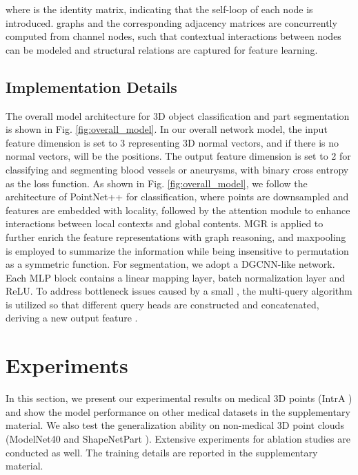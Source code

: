 \documentclass[10pt,twocolumn,letterpaper]{article}
\begin{document}
where  is the identity matrix, indicating that the self-loop of each node is introduced.  graphs and the corresponding adjacency matrices  are concurrently computed from  channel nodes, such that contextual interactions between nodes can be modeled and structural relations are captured for feature learning.


\subsection{Implementation Details}
The overall model architecture for 3D object classification and part segmentation is shown in Fig. \ref{fig:overall_model}.
In our overall network model, the input feature dimension  is set to 3 representing 3D normal vectors, and if there is no normal vectors,  will be the  positions.
The output feature dimension  is set to 2 for classifying and segmenting blood vessels or aneurysms, with binary cross entropy as the loss function.
As shown in Fig. \ref{fig:overall_model}, we follow the architecture of PointNet++ for classification, where points are downsampled and features are embedded with locality, followed by the attention module to enhance interactions between local contexts and global contents.
MGR is applied to further enrich the feature representations with graph reasoning, and maxpooling is employed to summarize the information while being insensitive to permutation as a symmetric function.
For segmentation, we adopt a DGCNN-like network.
Each MLP block contains a linear mapping layer, batch normalization layer and ReLU.
To address bottleneck issues caused by a small , the multi-query algorithm \cite{lambdanetworks} is utilized so that  different query heads are constructed and concatenated, deriving a new output feature .






\section{Experiments}
In this section, we present our experimental results on medical 3D points (IntrA \cite{yang2020intra}) and show the model performance on other medical datasets in the supplementary material.
We also test the generalization ability on non-medical 3D point clouds (ModelNet40 \cite{wu20153d} and ShapeNetPart \cite{shapenet}).
Extensive experiments for ablation studies are conducted as well.
The training details are reported in the supplementary material.
\end{document}
